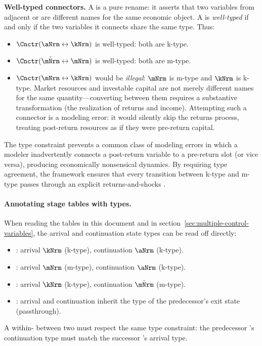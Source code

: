 \documentclass[SolvingMicroDSOPs]{subfiles}
\begin{document}
\noindent \textbf{Well-typed connectors.}
A {\Cnct} is a pure rename: it asserts that two variables from adjacent
{\stgs} or {\intervals} are different names for the same economic object.
A {\Cnct} is \textit{well-typed} if and only if the two variables it
connects share the same type. Thus:
\begin{itemize}
  \item $\Cnctr(\aNrm \leftrightarrow \kNrm)$ is well-typed: both are
    k-type.
  \item $\Cnctr(\check{\mNrm} \leftrightarrow \mNrm)$ is well-typed:
    both are m-type.
  \item $\Cnctr(\mNrm \leftrightarrow \kNrm)$ would be \textit{illegal}:
    $\mNrm$ is m-type and $\kNrm$ is k-type. Market resources and
    investable capital are not merely different names for the same
    quantity---converting between them requires a substantive
    transformation (the realization of returns and income). Attempting
    such a connector is a modeling error: it would silently skip the
    returns process, treating post-return resources as if they were
    pre-return capital.
\end{itemize}

\noindent The type constraint prevents a common class of modeling errors
in which a modeler inadvertently connects a post-return variable to a
pre-return slot (or vice versa), producing economically nonsensical
dynamics. By requiring type agreement, the framework ensures that every
transition between k-type and m-type passes through an explicit
returns-and-shocks {\stg}.

\paragraph{Annotating stage tables with types.}
When reading the {\prch} tables in this document and in
section~\ref{sec:multiple-control-variables}, the arrival and continuation
state types can be read off directly:
\begin{itemize}
  \item {}: arrival $\kNrm$ (k-type),
    continuation $\aNrm$ (k-type).
  \item {}: arrival $\mNrm$ (m-type),
    continuation $\aNrm$ (k-type).
  \item {}: arrival $\kNrm$ (k-type),
    continuation $\check{\mNrm}$ (m-type).
  \item {}: arrival and continuation inherit the type of
    the predecessor's exit state (passthrough).
\end{itemize}
A within-{\interval} {\Cnct} between two {\stgs} must respect the same
type constraint: the predecessor {\stg}'s continuation type must match
the successor {\stg}'s arrival type.
\end{document}

